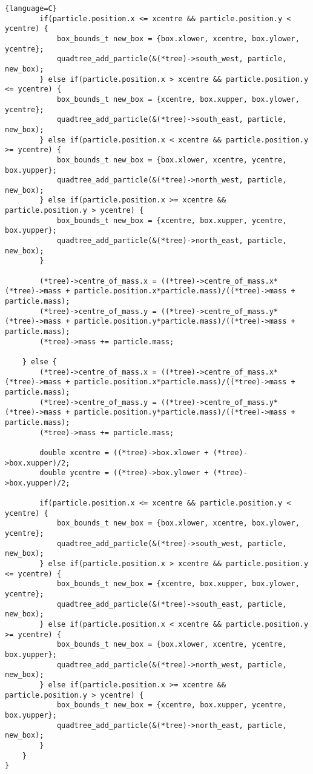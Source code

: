 \documentclass{article}
\begin{document}
\begin{lstlisting}{language=C}
        if(particle.position.x <= xcentre && particle.position.y < ycentre) {
            box_bounds_t new_box = {box.xlower, xcentre, box.ylower, ycentre};
            quadtree_add_particle(&(*tree)->south_west, particle, new_box);
        } else if(particle.position.x > xcentre && particle.position.y <= ycentre) {
            box_bounds_t new_box = {xcentre, box.xupper, box.ylower, ycentre};
            quadtree_add_particle(&(*tree)->south_east, particle, new_box);
        } else if(particle.position.x < xcentre && particle.position.y >= ycentre) {
            box_bounds_t new_box = {box.xlower, xcentre, ycentre, box.yupper};
            quadtree_add_particle(&(*tree)->north_west, particle, new_box);
        } else if(particle.position.x >= xcentre && particle.position.y > ycentre) {
            box_bounds_t new_box = {xcentre, box.xupper, ycentre, box.yupper};
            quadtree_add_particle(&(*tree)->north_east, particle, new_box);
        }

        (*tree)->centre_of_mass.x = ((*tree)->centre_of_mass.x*(*tree)->mass + particle.position.x*particle.mass)/((*tree)->mass + particle.mass);
        (*tree)->centre_of_mass.y = ((*tree)->centre_of_mass.y*(*tree)->mass + particle.position.y*particle.mass)/((*tree)->mass + particle.mass);
        (*tree)->mass += particle.mass;

    } else {
        (*tree)->centre_of_mass.x = ((*tree)->centre_of_mass.x*(*tree)->mass + particle.position.x*particle.mass)/((*tree)->mass + particle.mass);
        (*tree)->centre_of_mass.y = ((*tree)->centre_of_mass.y*(*tree)->mass + particle.position.y*particle.mass)/((*tree)->mass + particle.mass);
        (*tree)->mass += particle.mass;

        double xcentre = ((*tree)->box.xlower + (*tree)->box.xupper)/2;
        double ycentre = ((*tree)->box.ylower + (*tree)->box.yupper)/2;

        if(particle.position.x <= xcentre && particle.position.y < ycentre) {
            box_bounds_t new_box = {box.xlower, xcentre, box.ylower, ycentre};
            quadtree_add_particle(&(*tree)->south_west, particle, new_box);
        } else if(particle.position.x > xcentre && particle.position.y <= ycentre) {
            box_bounds_t new_box = {xcentre, box.xupper, box.ylower, ycentre};
            quadtree_add_particle(&(*tree)->south_east, particle, new_box);
        } else if(particle.position.x < xcentre && particle.position.y >= ycentre) {
            box_bounds_t new_box = {box.xlower, xcentre, ycentre, box.yupper};
            quadtree_add_particle(&(*tree)->north_west, particle, new_box);
        } else if(particle.position.x >= xcentre && particle.position.y > ycentre) {
            box_bounds_t new_box = {xcentre, box.xupper, ycentre, box.yupper};
            quadtree_add_particle(&(*tree)->north_east, particle, new_box);
        }
    }
} 
\end{lstlisting}
\end{document}
